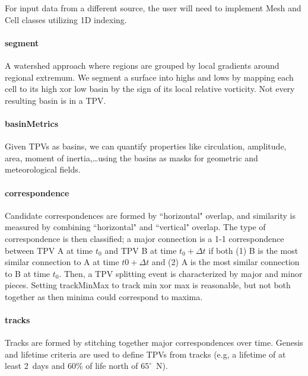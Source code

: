 \documentclass[a4paper]{article}
\begin{document}
For input data from a different source, the user will need to implement Mesh and Cell classes utilizing 1D indexing.

\paragraph{segment} A watershed approach where regions are grouped by local gradients around regional extremum. We segment a surface into highs and lows by mapping each cell to its high xor low basin by the sign of its local relative vorticity. Not every resulting basin is in a TPV.

\paragraph{basinMetrics} Given TPVs as basins, we can quantify properties like circulation, amplitude, area, moment of inertia,\dots using the basins as masks for geometric and meteorological fields.

\paragraph{correspondence} Candidate correspondences are formed by ``horizontal" overlap, and similarity is measured by combining ``horizontal" and ``vertical" overlap. The type of correspondence is then classified; a major connection is a 1-1 correspondence between TPV A at time $t_0$ and TPV B at time $t_0+\Delta t$ if both (1) B is the most similar connection to A at time $t0+\Delta t$ and (2) A is the most similar connection to B at time $t_0$. Then, a TPV splitting event is characterized by major and minor pieces. Setting trackMinMax to track min xor max is reasonable, but not both together as then minima could correspond to maxima.

\paragraph{tracks} Tracks are formed by stitching together major correspondences over time. Genesis and lifetime criteria are used to define TPVs from tracks (e.g, a lifetime of at least 2~days and 60\% of life north of $65^{\circ}$~N).
\end{document}
